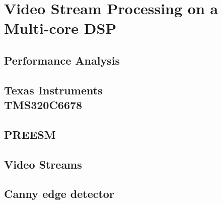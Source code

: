 \chapter{Video Stream Processing on a Multi-core DSP}
\label{chapter:experiments}


\section{Performance Analysis}
\label{sec:performance-analysis}


\section[Texas Instruments TMS320C6678]{Texas Instruments\\TMS320C6678}
\label{sec:c6678}


\section{PREESM}
\label{sec:preesm}


\section{Video Streams}
\label{sec:video-streams}


\section{Canny edge detector}
\label{sec:canny}


